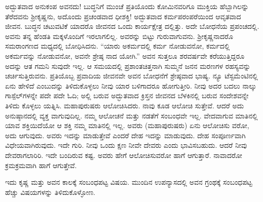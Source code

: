 ಅದ್ಭುತವಾದ ಅನುಕಂಪ ಅವನದು! ಬುದ್ಧನಿಗೆ ಮುಂಚೆ ಪ್ರತಿಯೊಂದು ಕೋಮಿನವರಿಗೂ ಮುಕ್ತಿಯ ಹೆಬ್ಬಾಗಿಲನ್ನು ತೆರೆದವನು ಶ‍್ರೀಕೃಷ್ಣನು, ಅದೊಂದು ಪ್ರಚಂಡವಾದ ಧೀಶಕ್ತಿ! ಅದ್ಭುತವಾದ ಕರ್ಮಪರಂಪರೆಯಿಂದ ಆವೃತವಾದ ಜೀವನ. ಬುದ್ಧನ ಚಟುವಟಿಕೆ ಯಾದರೊ ಜೀವನದ ಒಂದು ಕಾರ್ಯಕ್ಷೇತ್ರ ದಲ್ಲಿತ್ತು. ಅದೇ ಬೋಧನೆಯ ಪ್ರಪಂಚದಲ್ಲಿ. ಅವನು ತನ್ನ ಹೆಂಡತಿ ಮಕ್ಕಳೊಂದಿಗೆ ಇರಲಾಗಲಿಲ್ಲ. ಅವರನ್ನು ಬಿಟ್ಟು ಗುರುವಾಗುವನು. ಶ‍್ರೀಕೃಷ್ಣನಾದರೊ ಸಮರಾಂಗಣದ ಮಧ್ಯದಲ್ಲಿ ಬೋಧಿಸಿದನು. “ಯಾರು ಅಕರ್ಮದಲ್ಲಿ ಕರ್ಮ ನೋಡುವನೋ, ಕರ್ಮದಲ್ಲಿ ಅಕರ್ಮವನ್ನು ನೋಡುವನೋ, ಅವನೇ ಶ್ರೇಷ್ಠ ನಾದ ಯೋಗಿ.” ಅವನ ಸುತ್ತಲೂ ಶರವರ್ಷವೇ ಕರೆಯುತ್ತಿದ್ದರೂ ಅದನ್ನು ಆತ ಗಮನಿ ಸುವುದೇ ಇಲ್ಲ. ಆ ಸಮಯದಲ್ಲಿ ಪ್ರಶಾಂತಚಿತ್ತನಾಗಿ ಸುಮ್ಮನೆ ಜನನ ಮರಣಗಳ ರಹಸ್ಯವನ್ನು ಚರ್ಚಿಸುತ್ತಿರುವನು. ಪ್ರತಿಯೊಬ್ಬ ಪ್ರವಾದಿಯ ಜೀವನವೇ ಅವನ ಬೋಧನೆಗೆ ಶ್ರೇಷ್ಠವಾದ ಭಾಷ್ಯ. ನ್ಯೂ ಟೆಸ್ಟಮೆಂಟಿನಲ್ಲಿ ಏನು ಹೇಳಿದೆ ಎಂಬುದನ್ನು ತಿಳಿದುಕೊಳ್ಳಲು ನೀವು ಯಾರ ಬಳಿಗಾದರೂ ಹೋಗುತ್ತೀರಿ. ನೀವು ಅದರ ಬದಲು ನಾಲ್ಕು ಗಾಸ್ಪೆಲ್​ಗಳನ್ನೇ ಪದೇ ಪದೇ ಓದಿ; ಅಲ್ಲಿ ಬರುವ ಅದ್ಭುತವಾದ ಕ್ರಿಸ್ತನ ಜೀವನದ ಬೆಳಕಿನಲ್ಲಿ ಬರುವ ಸಂದೇಶವನ್ನೇ ತಿಳಿದು ಕೊಳ್ಳಲು ಯತ್ನಿಸಿ. ಮಹಾಪುರುಷರು ಆಲೋಚಿಸಿದರು. ನಾವು ಕೂಡ ಆಲೋಚಿ ಸುತ್ತೇವೆ. ಆದರೆ ಅದು ಅನುಷ್ಠಾನದಲ್ಲಿ ವ್ಯಕ್ತ ವಾಗುವುದಿಲ್ಲ. ನಮ್ಮ ಆಲೋಚನೆ ಮತ್ತು ನಡತೆಗೆ ಸಂಬಂಧವೇ ಇಲ್ಲ. ವೇದವಾಗುವ ಮಾತಿನಲ್ಲಿ ಯಾವ ಶಕ್ತಿಯಿದೆಯೋ ಆ ಶಕ್ತಿ ನಮ್ಮ ಮಾತಿನಲ್ಲಿ ಇಲ್ಲ. ಅವರು (ಮಹಾಪುರುಷರು) ಏನು ಆಲೋಚಿಸು ವರೋ, ಅದು ಆಗುವುದು. ಅವರು ಇದನ್ನು ಮಾಡುತ್ತೇವೆ ಎಂದರೆ ದೇಹ ಇದನ್ನು ಮಾಡುವುದು. ದೇಹ ಸಂಪೂರ್ಣವಾಗಿ ವಿಧೇಯವಾಗಿರುವುದು. ಇದೇ ಗುರಿ. ನೀವು ಒಂದು ಕ್ಷಣ ನೀವೇ ದೇವರು ಎಂದು ಭಾವಿಸಬಹುದು. ಆದರೆ ನೀವು ದೇವರಾಗಲಾರಿರಿ. ಇದೇ ಬಂದಿರುವ ಕಷ್ಟ. ಅವರು ಹೇಗೆ ಆಲೋಚಿಸುವರೋ ಹಾಗೆ ಆಗುತ್ತಾರೆ. ನಾವಾದರೋ ಕ್ರಮಕ್ರಮವಾಗಿ ಹಾಗೆ ಆಗುತ್ತೇವೆ.

ಇದು ಕೃಷ್ಣ ಮತ್ತು ಅವನ ಕಾಲಕ್ಕೆ ಸಂಬಂಧಪಟ್ಟ ವಿಷಯ. ಮುಂದಿನ ಉಪನ್ಯಾಸದಲ್ಲಿ ಅವನ ಗ್ರಂಥಕ್ಕೆ ಸಂಬಂಧಪಟ್ಟ ಹೆಚ್ಚು ವಿಷಯಗಳನ್ನು ತಿಳಿದುಕೊಳ್ಳೋಣ.

